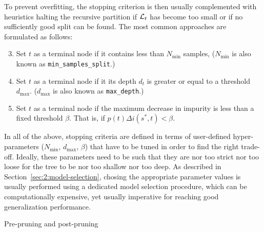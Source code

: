 To prevent overfitting, the stopping criterion is then usually complemented
with heuristics halting the recursive partition if ${\cal L}_t$ has become too
small or if no sufficiently good split can be found. The most common approaches
are formulated as follows:

\begin{enumerate}\setcounter{enumi}{2}

\item Set $t$ as a terminal node if it contains less than $N_\text{min}$ samples,
($N_\text{min}$ is also known as \texttt{min\_samples\_split}.)

\item Set $t$ as a terminal node if it its depth $d_t$ is greater or equal to a threshold $d_\text{max}$.
($d_\text{max}$ is also known as \texttt{max\_depth}.)

\item Set $t$ as a terminal node if the maximum decrease in impurity is less than
a fixed threshold $\beta$. That is, if $p(t) \Delta i(s^*, t) < \beta$.

\end{enumerate}

In all of the above, stopping criteria are defined in terms of user-defined
hyper-parameters ($N_\text{min}$, $d_\text{max}$, $\beta$) that have to be
tuned in order to find the right trade-off. Ideally, these parameters need to
be such that they are nor too strict nor too loose for the tree to be nor too
shallow nor too deep. As described in Section~\ref{sec:2:model-selection},
chosing the appropriate parameter values is usually performed using a dedicated
model selection procedure, which can be computationally expensive, yet usually
imperative for reaching good generalization performance.

\begin{remark}{Pre-pruning and post-pruning}

\end{remark}






